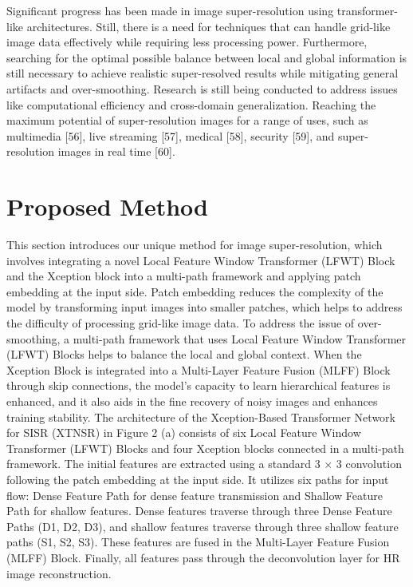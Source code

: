 \documentclass[twocolumn]{svjour3}          %
\begin{document}
Significant progress has been made in image super-resolution using transformer-like architectures. Still, there is a need for techniques that can handle grid-like image data effectively while requiring less processing power. Furthermore, searching for the optimal possible balance between local and global information is still necessary to achieve realistic super-resolved results while mitigating general artifacts and over-smoothing. Research is still being conducted to address issues like computational efficiency and cross-domain generalization. Reaching the maximum potential of super-resolution images for a range of uses, such as multimedia [56], live streaming [57], medical [58], security [59],  and super-resolution images in real time [60].

\section{Proposed Method}

This section introduces our unique method for image super-resolution, which involves integrating a novel Local Feature Window Transformer (LFWT) Block and the Xception block into a multi-path framework and applying patch embedding at the input side. Patch embedding reduces the complexity of the model by transforming input images into smaller patches, which helps to address the difficulty of processing grid-like image data. To address the issue of over-smoothing, a multi-path framework that uses Local Feature Window Transformer (LFWT) Blocks helps to balance the local and global context. When the Xception Block is integrated into a Multi-Layer Feature Fusion (MLFF) Block through skip connections, the model's capacity to learn hierarchical features is enhanced, and it also aids in the fine recovery of noisy images and enhances training stability.
The architecture of the Xception-Based Transformer Network for SISR (XTNSR) in Figure 2 (a) consists of six Local Feature Window Transformer (LFWT) Blocks and four Xception blocks connected in a multi-path framework. The initial features are extracted using a standard 3 × 3 convolution following the patch embedding at the input side. It utilizes six paths for input flow: Dense Feature Path for dense feature transmission and Shallow Feature Path for shallow features. Dense features traverse through three Dense Feature Paths (D1, D2, D3), and shallow features traverse through three shallow feature paths (S1, S2, S3). These features are fused in the Multi-Layer Feature Fusion (MLFF) Block. Finally, all features pass through the deconvolution layer for HR image reconstruction.
\end{document}
